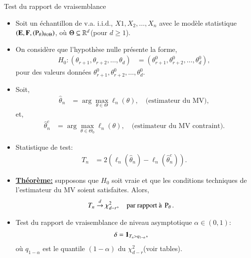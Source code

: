 \begin{frame}
    [allowframebreaks]{Test du rapport de vraisemblance}
    \begin{itemize}
        \item Soit un échantillon de v.a. i.i.d., $X1, X_2,\ldots, X_n$ avec le modèle statistique 
         $\left(\mathbf{E}, \mathbf{F}, (\operatorname{P}_{\theta})_{\theta\in\Theta}\right)$, où 
         $\Theta\subseteq \mathbb{R}^d$(pour $d\geq 1$).
         \item On considère que l'hypothèse nulle présente la forme, \begin{align*}
             H_0 : (\theta_{r+1}, \theta_{r+2}, \ldots, \theta_d) &= (\theta_{r+1}^0, \theta_{r+2}^0, \ldots, \theta_d^0),
         \end{align*}
         pour des valeurs données $\theta_{r+1}^0, \theta_{r+2}^0, \ldots, \theta_d^0$.
         \item Soit,
         \begin{align*}
             \hat{\theta}_n &=\arg\max_{\theta\in\Theta}\ell_n(\theta), \quad\text{(estimateur du MV)},
         \end{align*}
         et,
         \begin{align*}
            \hat{\theta}_n^c &=\arg\max_{\theta\in\Theta_0}\ell_n(\theta), \quad\text{(estimateur du MV contraint)}.
         \end{align*}
         \framebreak 
        \item Statistique de test: \begin{align*}
            T_n &= 2\left(\ell_n(\hat{\theta}_n) - \ell_n(\hat{\theta}_n^c)\right).
        \end{align*}
        \item \textbf{\underline{Théorème:}} supposons que $H_0$ soit vraie et que les conditions 
        techniques de l'estimateur du MV soient satisfaites. Alors,
        \begin{align*}
            T_n &\overset{d}{\rightarrow} \chi^2_{d-r}, \quad \text{par rapport à }  \operatorname{P}_{\theta}.
        \end{align*}
        \item Test du rapport de vraisemblance de niveau asymptotique $\alpha\in(0, 1)$: 
        \begin{align*}
            \delta &=\mathbf{1}_{T_n > q_{1-\alpha}},
        \end{align*}
        où $q_{1-\alpha}$ est le quantile $(1-\alpha)$ du $\chi^2_{d-r}$(voir tables).
    \end{itemize}
\end{frame}
